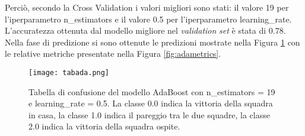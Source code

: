 Perciò, secondo la Cross Validation i valori migliori sono stati: il valore 19 per l'iperparametro \textsf{n\_estimators} e il valore 0.5 per l'iperparametro \textsf{learning\_rate}. L'accuratezza ottenuta dal modello migliore nel \emph{validation} \emph{set} è stata di 0.78.\\
Nella fase di predizione si sono ottenute le predizioni mostrate nella Figura \ref{fig:tabada} con le relative metriche presentate nella Figura \ref{fig:adametrics}.
\begin{figure}[h]
	\begin{center}
		\texttt{[image: tabada.png]}
		\caption{Tabella di confusione del modello AdaBoost con \textsf{n\_estimators} = 19 e \textsf{learning\_rate} = 0.5. La classe 0.0 indica la vittoria della squadra in casa, la classe 1.0 indica il pareggio tra le due squadre, la classe 2.0 indica la vittoria della squadra ospite.
		} 
		\label{fig:tabada}
	\end{center}
\end{figure}

